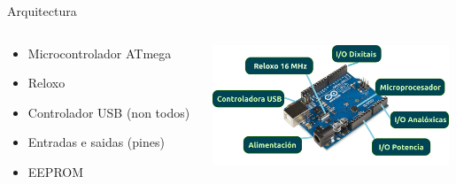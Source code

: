 \documentclass{beamer}
\begin{document}
\begin{frame}{Arquitectura}
\begin{columns}
	\begin{column}{0.4\textwidth}
		\begin{itemize}
			\item Microcontrolador ATmega
			\item Reloxo
			\item Controlador USB (non todos)
			\item Entradas e saidas (pines)
			\item EEPROM
		\end{itemize}
	\end{column}
	\begin{column}{0.6\textwidth}
		\includegraphics[width=200pt]{./img/arduinoUNOExplicado.png}
	\end{column}
\end{columns}
\end{frame}
\end{document}
